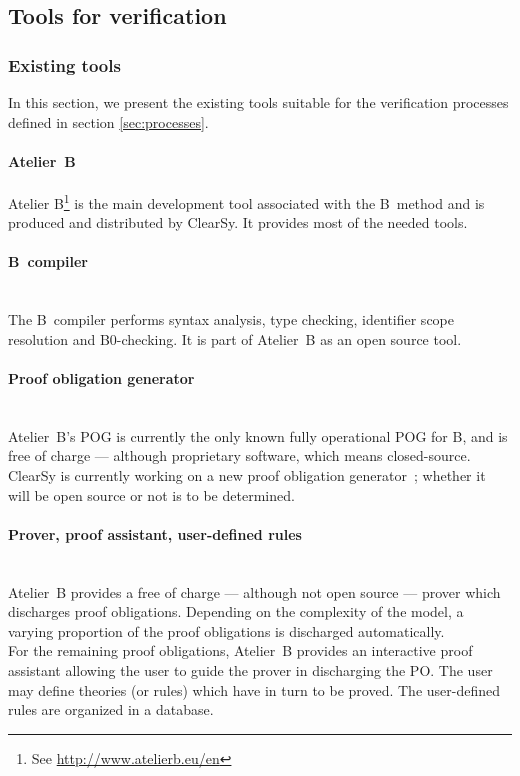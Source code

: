 \subsection{Tools for verification}
\label{sec:tools}

\subsubsection{Existing tools}
In this section, we present the existing tools suitable for the verification processes defined in section \ref{sec:processes}.

\paragraph{Atelier~B}
\label{subsec:atelierb}
Atelier B\footnote{See \url{http://www.atelierb.eu/en}} is the main development tool associated with the B~method and is produced and distributed by ClearSy. It provides most of the needed tools.

\paragraph{B~compiler}~\\
The B~compiler performs syntax analysis, type checking, identifier scope resolution and B0-checking. It is part of Atelier~B as an open source tool.

\paragraph{Proof obligation generator}~\\
Atelier~B's POG is currently the only known fully operational POG for B, and is free of charge --- although proprietary software, which means closed-source. ClearSy is currently working on a new proof obligation generator~; whether it will be open source or not is to be determined.

\paragraph{Prover, proof assistant, user-defined rules}~\\
Atelier~B provides a free of charge --- although not open source --- prover which discharges proof obligations. Depending on the complexity of the model, a varying proportion of the proof obligations is discharged automatically.\\
For the remaining proof obligations, Atelier~B provides an interactive proof assistant allowing the user to guide the prover in discharging the PO. The user may define theories (or rules) which have in turn to be proved. The user-defined rules are organized in a database. 

